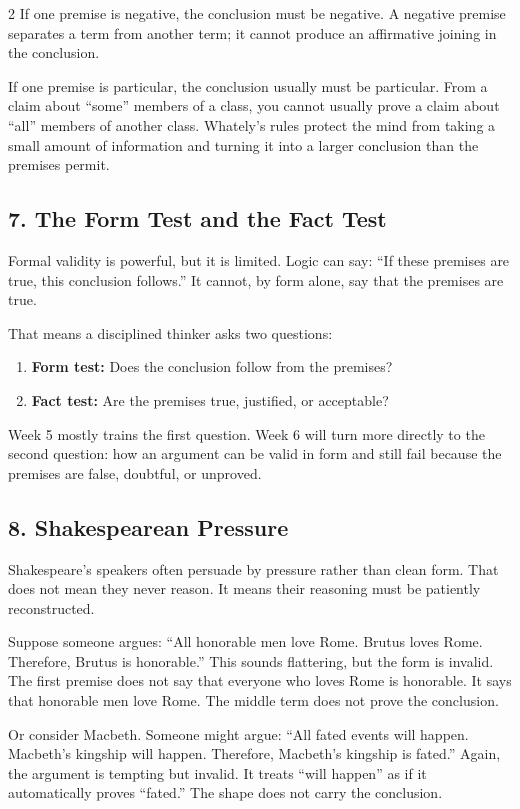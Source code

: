 \documentclass[12pt]{article}
\begin{document}
\begin{multicols}{2}
If one premise is negative, the conclusion must be negative. A negative premise separates a term from another term; it cannot produce an affirmative joining in the conclusion.

If one premise is particular, the conclusion usually must be particular. From a claim about ``some'' members of a class, you cannot usually prove a claim about ``all'' members of another class. Whately's rules protect the mind from taking a small amount of information and turning it into a larger conclusion than the premises permit.

\subsection*{7. The Form Test and the Fact Test}
Formal validity is powerful, but it is limited. Logic can say: ``If these premises are true, this conclusion follows.'' It cannot, by form alone, say that the premises are true.

That means a disciplined thinker asks two questions:
\begin{enumerate}[leftmargin=*]
\item \textbf{Form test:} Does the conclusion follow from the premises?
\item \textbf{Fact test:} Are the premises true, justified, or acceptable?
\end{enumerate}

Week 5 mostly trains the first question. Week 6 will turn more directly to the second question: how an argument can be valid in form and still fail because the premises are false, doubtful, or unproved.

\subsection*{8. Shakespearean Pressure}
Shakespeare's speakers often persuade by pressure rather than clean form. That does not mean they never reason. It means their reasoning must be patiently reconstructed.

Suppose someone argues: ``All honorable men love Rome. Brutus loves Rome. Therefore, Brutus is honorable.'' This sounds flattering, but the form is invalid. The first premise does not say that everyone who loves Rome is honorable. It says that honorable men love Rome. The middle term does not prove the conclusion.

Or consider Macbeth. Someone might argue: ``All fated events will happen. Macbeth's kingship will happen. Therefore, Macbeth's kingship is fated.'' Again, the argument is tempting but invalid. It treats ``will happen'' as if it automatically proves ``fated.'' The shape does not carry the conclusion.


\end{multicols}
\end{document}
